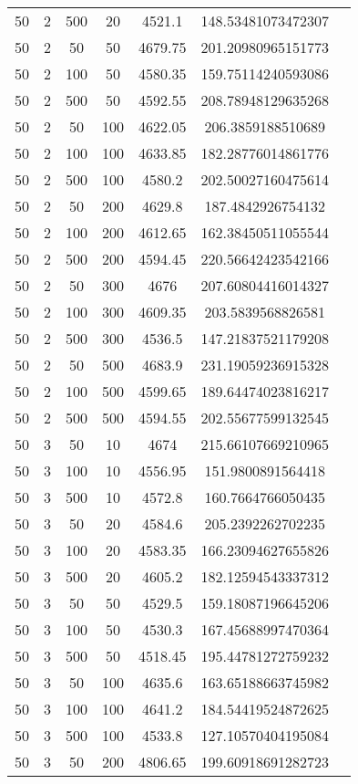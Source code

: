 {\begin{longtabu}{S
S
S
S
S
S[round-mode=places, round-precision=0]
S[round-mode=places, round-precision=0]}
50 & 2 & 500 & 20 & 4521.1 & 148.53481073472307 \\
50 & 2 & 50 & 50 & 4679.75 & 201.20980965151773 \\
50 & 2 & 100 & 50 & 4580.35 & 159.75114240593086 \\
50 & 2 & 500 & 50 & 4592.55 & 208.78948129635268 \\
50 & 2 & 50 & 100 & 4622.05 & 206.3859188510689 \\
50 & 2 & 100 & 100 & 4633.85 & 182.28776014861776 \\
50 & 2 & 500 & 100 & 4580.2 & 202.50027160475614 \\
50 & 2 & 50 & 200 & 4629.8 & 187.4842926754132 \\
50 & 2 & 100 & 200 & 4612.65 & 162.38450511055544 \\
50 & 2 & 500 & 200 & 4594.45 & 220.56642423542166 \\
50 & 2 & 50 & 300 & 4676 & 207.60804416014327 \\
50 & 2 & 100 & 300 & 4609.35 & 203.5839568826581 \\
50 & 2 & 500 & 300 & 4536.5 & 147.21837521179208 \\
50 & 2 & 50 & 500 & 4683.9 & 231.19059236915328 \\
50 & 2 & 100 & 500 & 4599.65 & 189.64474023816217 \\
50 & 2 & 500 & 500 & 4594.55 & 202.55677599132545 \\
50 & 3 & 50 & 10 & 4674 & 215.66107669210965 \\
50 & 3 & 100 & 10 & 4556.95 & 151.9800891564418 \\
50 & 3 & 500 & 10 & 4572.8 & 160.7664766050435 \\
50 & 3 & 50 & 20 & 4584.6 & 205.2392262702235 \\
50 & 3 & 100 & 20 & 4583.35 & 166.23094627655826 \\
50 & 3 & 500 & 20 & 4605.2 & 182.12594543337312 \\
50 & 3 & 50 & 50 & 4529.5 & 159.18087196645206 \\
50 & 3 & 100 & 50 & 4530.3 & 167.45688997470364 \\
50 & 3 & 500 & 50 & 4518.45 & 195.44781272759232 \\
50 & 3 & 50 & 100 & 4635.6 & 163.65188663745982 \\
50 & 3 & 100 & 100 & 4641.2 & 184.54419524872625 \\
50 & 3 & 500 & 100 & 4533.8 & 127.10570404195084 \\
50 & 3 & 50 & 200 & 4806.65 & 199.60918691282723 \\

\end{longtabu}}
